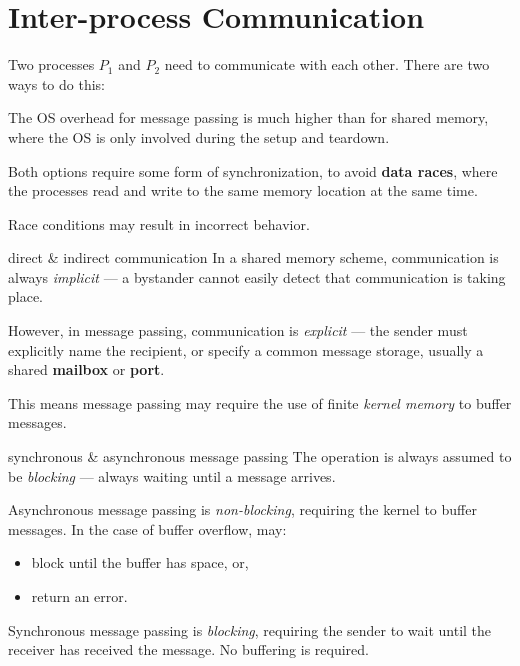\section{Inter-process Communication}
Two processes $P_1$ and $P_2$ need to communicate with each other. There are two ways to do this:
\begin{enumerate*}
\end{enumerate*}

The OS overhead for message passing is much higher than for shared memory, where the OS is only involved during the setup and teardown.

Both options require some form of synchronization, to avoid \textbf{data races},
where the processes read and write to the same memory location at the same time.

Race conditions may result in incorrect behavior.

\begin{defn}{direct \& indirect communication}
    In a shared memory scheme, communication is always \textit{implicit} --- a bystander cannot easily detect that communication is taking place.

    However, in message passing, communication is \textit{explicit} --- the sender must explicitly name the recipient, or specify a common message storage, usually a shared \textbf{mailbox} or \textbf{port}.

    This means message passing may require the use of finite \textit{kernel memory} to buffer messages.
\end{defn}

\begin{defn}{synchronous \& asynchronous message passing}
    The  operation is always assumed to be \textit{blocking} --- always waiting until a message arrives.
    
    Asynchronous message passing is \textit{non-blocking}, requiring the kernel to buffer messages. In the case of buffer overflow,  may:
    \begin{itemize}
        \item block until the buffer has space, or,
        \item return an error.
    \end{itemize}

    Synchronous message passing is \textit{blocking}, requiring the sender to wait until the receiver has received the message. No buffering is required.
\end{defn}

